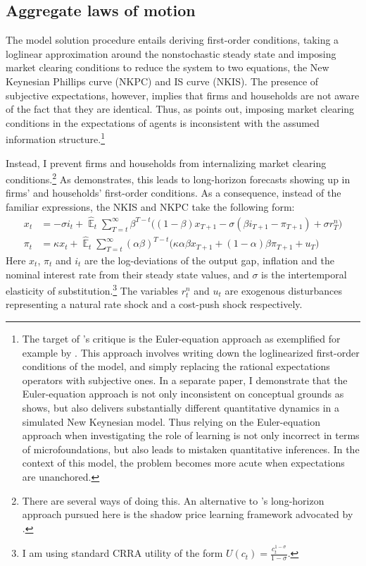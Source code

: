 \documentclass[11pt]{article}
\renewcommand{\[}{\begin{equation}}
\renewcommand{\]}{\end{equation}}
\DeclareMathOperator{\E}{\mathbb{E}}
\begin{document}
\subsection{Aggregate laws of motion}\label{FOCs}
The model solution procedure entails deriving first-order conditions, taking a loglinear approximation around the nonstochastic steady state and imposing market clearing conditions to reduce the system to two equations, the New Keynesian Phillips curve (NKPC) and IS curve (NKIS). The presence of subjective expectations, however, implies that firms and households are not aware of the fact that they are identical. Thus, as \cite{preston2005} points out, imposing market clearing conditions in the expectations of agents is inconsistent with the assumed information structure.\footnote{The target of \cite{preston2005}'s critique is the Euler-equation approach as exemplified for example by \cite{bullard2002learning}. This approach involves writing down the loglinearized first-order conditions of the model, and simply replacing the rational expectations operators with subjective ones. In a separate paper, I demonstrate that the Euler-equation approach is not only inconsistent on conceptual grounds as \cite{preston2005} shows, but also delivers substantially different quantitative dynamics in a simulated New Keynesian model. Thus relying on the Euler-equation approach when investigating the role of learning is not only incorrect in terms of microfoundations, but also leads to mistaken quantitative inferences. In the context of this model, the problem becomes more acute when expectations are unanchored.} 

Instead, I prevent firms and households from internalizing market clearing conditions.\footnote{There are several ways of doing this. An alternative to \cite{preston2005}'s long-horizon approach pursued here is the shadow price learning framework advocated by \cite{evans2009SP}.} As \cite{preston2005} demonstrates, this leads to long-horizon forecasts showing up in firms' and households' first-order conditions. As a consequence, instead of the familiar expressions, the NKIS and NKPC take the following form:
 \begin{align}
x_t &=  -\sigma i_t +\hat{\E}_t \sum_{T=t}^{\infty} \beta^{T-t }\big( (1-\beta)x_{T+1} - \sigma(\beta i_{T+1} - \pi_{T+1}) +\sigma r_T^n \big)  \label{NKIS}  \\
\pi_t &= \kappa x_t +\hat{\E}_t \sum_{T=t}^{\infty} (\alpha\beta)^{T-t }\big( \kappa \alpha \beta x_{T+1} + (1-\alpha)\beta \pi_{T+1} + u_T\big) \label{NKPC} 
\end{align}
Here $x_t$, $\pi_t$ and $i_t$ are the log-deviations of the output gap, inflation and the nominal interest rate from their steady state values, and $\sigma$ is the intertemporal elasticity of substitution.\footnote{I am using standard CRRA utility of the form $U(c_t) = \frac{c_t^{1-\sigma}}{1-\sigma}$.} The variables $r_t^n$ and $u_t$ are exogenous disturbances representing a natural rate shock and a cost-push shock respectively. 
\end{document}
